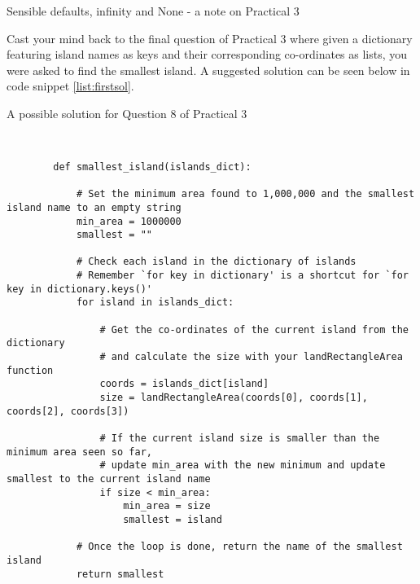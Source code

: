 \documentclass[a4paper]{article}
\begin{document}
\begin{center}
{\huge{Sensible defaults, infinity and None - a note on Practical 3}}
\noindent\makebox[\linewidth]{\rule{\paperwidth}{0.4pt}}
\end{center}

\vskip 0.5cm

Cast your mind back to the final question of Practical 3 where
given a dictionary featuring island names as keys
and their corresponding co-ordinates as lists, you were asked to find the smallest
island. A suggested solution can be seen below in code snippet \ref{list:firstsol}.

\begin{listing}[H]
    \caption[]{A possible solution for Question 8 of Practical 3}
    \label{list:firstsol}
    \begin{verbatim}


        def smallest_island(islands_dict):

            # Set the minimum area found to 1,000,000 and the smallest island name to an empty string
            min_area = 1000000
            smallest = ""

            # Check each island in the dictionary of islands
            # Remember `for key in dictionary' is a shortcut for `for key in dictionary.keys()'
            for island in islands_dict:

                # Get the co-ordinates of the current island from the dictionary
                # and calculate the size with your landRectangleArea function
                coords = islands_dict[island]
                size = landRectangleArea(coords[0], coords[1], coords[2], coords[3])

                # If the current island size is smaller than the minimum area seen so far,
                # update min_area with the new minimum and update smallest to the current island name
                if size < min_area:
                    min_area = size
                    smallest = island

            # Once the loop is done, return the name of the smallest island
            return smallest

    \end{verbatim}
\end{listing}
\end{document}
